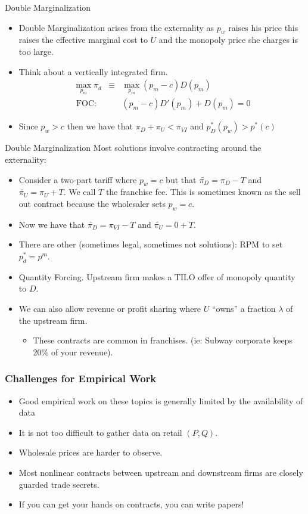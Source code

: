 \documentclass[aspectratio=169,11pt]{beamer}
\begin{document}
\begin{frame}{Double Marginalization}
\begin{itemize}
\item Double Marginalization arises from the externality as $p_w$ raises his price this raises the effective marginal cost to $U$ and the monopoly price she charges is too large.
\item Think about a vertically integrated firm.
\begin{eqnarray*}
\max_{p_m} \pi_d &\equiv& \max_{p_m} (p_m-c) D(p_m) \\
\mbox{ FOC: }&&  (p_m - c) D'(p_m) + D(p_m) = 0
\end{eqnarray*}
\item Since $p_w > c$ then we have that $\pi_D + \pi_U < \pi_{VI}$ and $p_D^*(p_w) > p^*(c)$
\end{itemize}
\end{frame}


\begin{frame}{Double Marginalization}
Most solutions involve contracting around the externality:
\begin{itemize}
\item Consider a \alert{two-part tariff} where $p_w = c$ but that $\widetilde{\pi_D} =\pi_D -T$ and  $\widetilde{\pi_U} =\pi_U +T$. We call $T$ the \alert{franchise fee}. This is sometimes known as the \alert{sell out contract} because the wholesaler sets $p_w=c$. 
\item Now we have that $\widetilde{\pi_D} = \pi_{VI} - T$ and $\widetilde{\pi_U} = 0 + T$.
\item There are other (sometimes legal, sometimes not solutions): \alert{RPM} to set $p_d^* = p^m.$
\item \alert{Quantity Forcing}. Upstream firm makes a TILO offer of monopoly quantity to $D$.
\item We can also allow \alert{revenue or profit sharing } where $U$ ``owns'' a fraction $\lambda$ of the upstream firm.
\begin{itemize}
\item These contracts are common in franchises. (ie: Subway corporate keeps 20\% of your revenue).
\end{itemize}
\end{itemize}
\end{frame}


\begin{frame}
\small
\frametitle{Challenges for  Empirical Work}
\begin{itemize}
\item Good empirical work on these topics is generally limited by the availability of data
\item It is not too difficult to gather data on retail $(P,Q)$.
\item Wholesale prices are harder to observe.
\item Most nonlinear contracts between upstream and downstream firms are closely guarded trade secrets.
\item If you can get your hands on contracts, you can write papers!
\end{itemize}
\end{frame}
\end{document}
